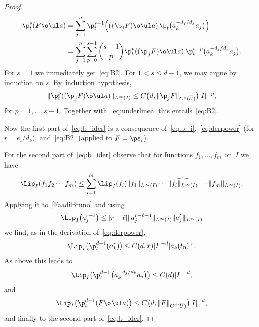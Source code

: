 \begin{proof}
\begin{align*}
 \p_t^s (F \o \ul a)
 &= \sum_{j=1}^n \p_t^{s-1}\Big(((\p_{j} F)\o \ul a)\, \p_t \big( a_k^{- d_j/d_k} a_j\big)\Big)
 \\
 &= \sum_{j=1}^n \sum_{p=0}^{s-1}
 \binom{s-1}{p} \p_t^{p}((\p_{j} F)\o \ul a)\, \p_t^{s- p} \big( a_k^{- d_j/d_k} a_j\big).
 \end{align*}
 For $s=1$ we immediately get~\eqref{eq:B2}. For $1< s \le d-1$, we may argue by induction on $s$. By~induction hypothesis,
 \begin{gather*}
 \|\p_t^{p}((\p_{j} F)\o \ul a)\|_{L^\infty(I)} \le C\big(d,\|\p_{j} F\|_{C^{s}(\overline U)}\big) |I|^{-p},
 \end{gather*}
 for $p = 1,\dots,s-1$. Together with~\eqref{eq:underlinea} this entails~\eqref{eq:B2}.





 Now the first part of~\eqref{eq:b_ider} is a consequence of~\eqref{eq:b_i},~\eqref{eq:derpower} (for $r = e_i/d_k$),
 and~\eqref{eq:B2} (applied to $F= \ps_i$).




For the second part of~\eqref{eq:b_ider}
observe that for functions $f_1,\dots,f_m$ on~$I$ we have
\begin{gather*}
 \Lip_I(f_1 f_2 \cdots f_m) \le \sum_{i=1}^m \Lip_I(f_i) \|f_1\|_{L^{\infty}(I)} \cdots \widehat{\|f_i\|_{L^{\infty}(I)}}
 \cdots \|f_m\|_{L^{\infty}(I)}.
\end{gather*}
Applying it to~\eqref{FaadiBruno} and using
\begin{gather*}
 \Lip_I\big(a_j^{r-\ell}\big) \le |r-\ell| \|a_j^{r-\ell-1} \|_{L^\infty(I)} \| a_j'\|_{L^\infty(I)}
\end{gather*}
we find, as in the derivation of~\eqref{eq:derpower},
\begin{gather*}
 \Lip_I\big(\p_t^{d-1}( a_k^r)\big) \le C(d,r) |I|^{-d} |a_k(t_0)|^{r}.
\end{gather*}
As above this leads to
\begin{gather*}
 \Lip_I\big(\p_t^{d-1} \big( a_k^{- d_j/d_k} a_j\big) \big)
 \le C(d) |I|^{-d},
 \end{gather*}
and
\begin{gather*}
 \Lip_I \big(\p_t^{d-1}(F \o \ul a)\big) \le C\big(d, \|F\|_{C^d(\overline U)}\big) |I|^{-d},
\end{gather*}
and finally to the second part of~\eqref{eq:b_ider}.
\end{proof}





